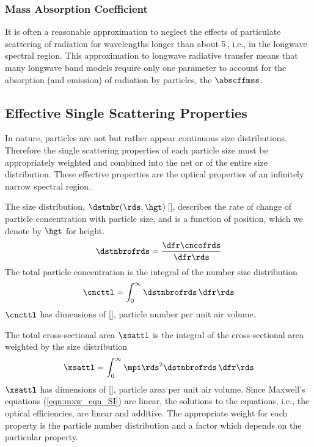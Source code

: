 \documentclass[12pt]{article}
\begin{document}
\subsubsection[Mass Absorption Coefficient]{Mass Absorption Coefficient}\label{sxn:mac_opt}
It is often a reasonable approximation to neglect the effects of
particulate scattering of radiation for wavelengths longer than about
5\,\um, i.e., in the longwave spectral region. 
This approximation to longwave radiative transfer means that many
longwave band models require only one parameter to account for the
absorption (and emission) of radiation by particles, the  $\abscffmss$.

\subsection{Effective Single Scattering Properties}\label{sxn:ffc}
In nature, particles are not  but rather appear
continuous size distributions.
Therefore the single scattering properties of each particle size must
be appropriately weighted and combined into the net or
 of the entire size
distribution.
These effective properties are the optical properties of an infinitely
narrow spectral region.   

The size distribution, $\dstnbr(\rds,\hgt)$\,[\nbrxmCm], describes
the rate of change of particle concentration with particle size,
and is a function of position, which we denote by $\hgt$ for height.
\begin{equation}
\dstnbrofrds = \frac{\dfr\cncofrds}{\dfr\rds}
\label{eqn:dst_dfn}
\end{equation}
The total particle concentration is the integral of the number size 
distribution 
\begin{equation}
\cncttl = \int_{0}^{\infty} \dstnbrofrds \,\dfr\rds
\label{eqn:cnc_ttl_dfn}
\end{equation}
$\cncttl$ has dimensions of [\nbrxmC], particle number per unit air volume.

The total cross-sectional area $\xsattl$ is the integral of the
cross-sectional area weighted by the size distribution 
\begin{equation}
\xsattl = \int_{0}^{\infty} \mpi \rds^{2} \dstnbrofrds \,\dfr\rds
\label{eqn:xsa_ttl_dfn}
\end{equation}
$\xsattl$ has dimensions of [\mSxmC], particle area per unit air
volume.  
Since Maxwell's equations (\ref{eqn:mxw_eqn_SI}) are linear, the
solutions to the equations, i.e., the optical efficiencies, are linear
and additive.  
The appropriate weight for each property is the particle number
distribution and a factor which depends on the particular property. 
\end{document}
